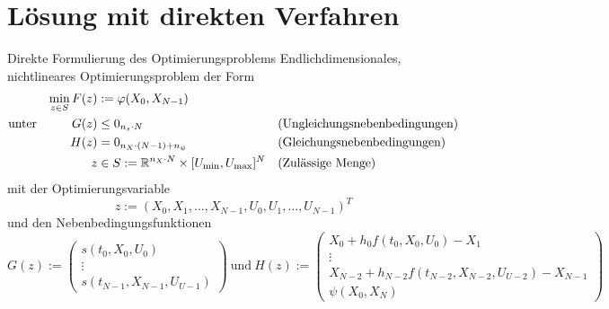 \documentclass[aspectratio=169]{beamer}
\newcommand{\R}{\mathbb{R}}
\begin{document}
\section{Lösung mit direkten Verfahren}
\begin{frame}
  \begin{block}{Direkte Formulierung des Optimierungsproblems}
    \scriptsize
    Endlichdimensionales, nichtlineares Optimierungsproblem der Form
    \begin{align*}
        \min_{z \in S} F(z) &:= \varphi(X_0,X_{N-1}) & & \\
        \text{unter} \hspace{10mm} G(z) &\leq 0_{n_s \cdot N} & &  \text{(Ungleichungsnebenbedingungen)} \\
        H(z) &= 0_{n_X \cdot (N-1) + n_{\psi}} & & \text{(Gleichungsnebenbedingungen)}\\
        z &\in S := \R^{n_X \cdot N} \times [U_{\min},U_{\max}]^{N} & &  \text{(Zulässige Menge)}
    \end{align*}
    mit der Optimierungsvariable
    \begin{equation*}
        z := (X_0,X_1,...,X_{N-1},U_0,U_1,...,U_{N-1})^T
    \end{equation*}
    und den Nebenbedingungsfunktionen 
    \begin{equation*}
        G(z) := 
        \begin{pmatrix}
            s(t_0,X_0,U_0) \\ 
            \vdots \\ 
            s(t_{N-1},X_{N-1},U_{U-1})
        \end{pmatrix}
        \ \text{und}\ H(z) := 
        \begin{pmatrix}
            X_0 + h_0 f(t_0,X_0,U_0) - X_1 \\ 
            \vdots \\ 
            X_{N-2} + h_{N-2} f(t_{N-2},X_{N-2},U_{U-2}) - X_{N-1} \\
            \psi(X_0,X_N)
        \end{pmatrix} 
    \end{equation*}
    \end{block}
\end{frame}
\end{document}
